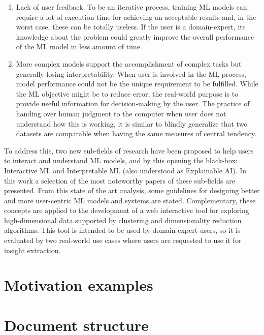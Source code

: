 \begin{enumerate}
\item Lack of user feedback. To be an iterative process, training ML models can require a lot of execution time for achieving an acceptable results and, in the worst case, these can be totally useless. If the user is a domain-expert, its knowledge about the problem could greatly improve the overall performance of the ML model in less amount of time.
\item More complex models support the accomplishment of complex tasks but generally losing interpretability. When user is involved in the ML process, model performance could not be the unique requirement to be fulfilled. While the ML objective might be to reduce error, the real-world purpose is to provide useful information \cite{Lipton2017} for decision-making by the user. The practice of handing over human judgment to the computer when user does not understand how this is working, it is similar to blindly generalize that two datasets are comparable when having the same measures of central tendency.
\end{enumerate}

To address this, two new sub-fields of research have been proposed to help users to interact and understand ML models, and by this opening the black-box: Interactive ML and Interpretable ML (also understood as Explainable AI). In this work a selection of the most noteworthy papers of these sub-fields are presented. From this state of the art analysis, some guidelines for designing better and more user-centric ML models and systems are stated. Complementary, these concepts are applied to the development of a web interactive tool for exploring high-dimensional data supported by clustering and dimensionality reduction algorithms. This tool is intended to be used by domain-expert users, so it is evaluated by two real-world use cases where users are requested to use it for insight extraction.

\section{Motivation examples} %
\label{section1.1}



\section{Document structure} %
\label{section1.2}


